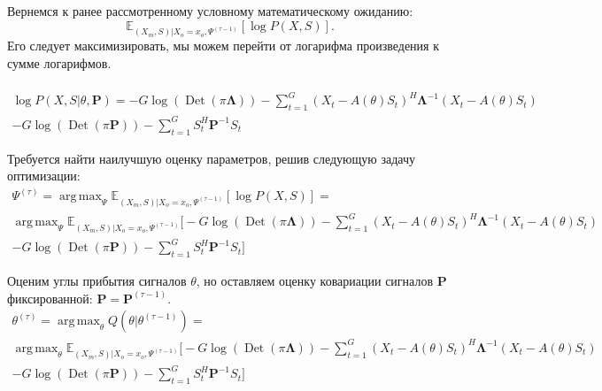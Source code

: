 \documentclass[11pt]{article}
\newcommand{\Expect}{\mathbb{E}}
\DeclareMathOperator*{\argmax}{arg\,max}
\DeclareMathOperator{\Det}{Det}
\begin{document}
Вернемся к ранее рассмотренному условному математическому ожиданию:
\begin{equation*}
 \Expect_{(X_m,S)|X_o=x_o, \Psi^{(\tau-1)}}[\log P(X, S)].
\end{equation*}
Его следует максимизировать, мы можем перейти от логарифма произведения к сумме логарифмов. 
\\
\\
\begin{equation*}
\begin{gathered}
\log P(X,S|\theta, \mathbf{P}) = -G \log (\Det(\pi \mathbf{\Lambda})) - \sum_{t=1}^G (X_t-A(\theta)S_t)^H \mathbf{\Lambda}^{-1}(X_t-A(\theta)S_t) 
\\ - G \log(\Det(\pi \mathbf{P})) - \sum_{t=1}^G S_t^H \mathbf{P}^{-1}S_t
\end{gathered}
\end{equation*}
\begin{center}
\fontsize{14}{18}\selectfont {}
\end{center}
Требуется найти наилучшую оценку параметров, решив следующую задачу оптимизации:
\begin{equation*}
\begin{gathered}
\Psi^{(\tau)}=\argmax_{\Psi} \Expect_{(X_m,S)|X_o=x_o, \Psi^{(\tau-1)}}[\log P(X, S)] = \\
\argmax_{\Psi} \Expect_{(X_m,S)|X_o=x_o, \Psi^{(\tau-1)}}\bigg[-G \log (\Det(\pi \mathbf{\Lambda})) - \sum_{t=1}^G (X_t-A(\theta)S_t)^H \mathbf{\Lambda}^{-1}(X_t-A(\theta)S_t) 
\\ - G \log(\Det(\pi \mathbf{P})) - \sum_{t=1}^G S_t^H \mathbf{P}^{-1}S_t\bigg]
\end{gathered}
\end{equation*}
\clearpage
\begin{center}
\fontsize{14}{18}\selectfont {}
\end{center}
Оценим углы прибытия сигналов $\theta$, но оставляем оценку ковариации сигналов $\mathbf{P}$ фиксированной: $\mathbf{P} = \mathbf{P}^{(\tau-1)}$.
\begin{equation*}
\begin{gathered}
\theta^{(\tau)}= \argmax_{\theta} Q(\theta | \theta^{(\tau-1)}) = \\
\argmax_{\theta} \Expect_{(X_m,S)|X_o=x_o, \Psi^{(\tau-1)}}\bigg[-G \log (\Det(\pi \mathbf{\Lambda})) - \sum_{t=1}^G (X_t-A(\theta)S_t)^H \mathbf{\Lambda}^{-1}(X_t-A(\theta)S_t) 
\\ - G \log(\Det(\pi \mathbf{P})) - \sum_{t=1}^G S_t^H \mathbf{P}^{-1}S_t\bigg]
\end{gathered}
\end{equation*}
\end{document}
